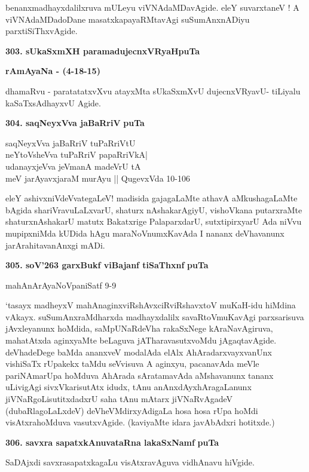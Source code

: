benanxmadhayxdalilxruva mULeyu viVNAdaMDavAgide. eleY suvarxtaneV ! A viVNAdaMDadoDane masatxkapayaRMtavAgi suSumAnxnADiyu parxtiSiThxvAgide.

\medskip
\noindent
\textbf{303. sUkaSxmXH paramadujecnxVRyaH\hfill {\bf puTa \pageref{40b}}}

\hfill {\bf rAmAyaNa - (4-18-15)}

\smallskip
dhamaRvu - paratatatxvXvu atayxMta sUkaSxmXvU dujecnxVRyavU- tiLiyalu kaSaTxsAdhayxvU Agide.

\medskip
\noindent
\textbf{304. saqNeyxVva jaBaRriV} \hfill {\bf puTa \pageref{page113}}

\begin{shloka}
saqNeyxVva jaBaRriV tuPaRriVtU\\
neYtoVsheVva tuPaRriV papaRriVkA|\\
udanayxjeVva jeVmanA madeVrU tA\\
meV jarAyavxjaraM murAyu || \hfill{QugevxVda 10-106}
\end{shloka}

eleY ashivxniVdeVvategaLeV! madisida gajagaLaMte athavA aMkushagaLaMte bAgida shariVravuLaLxvarU, shaturx nAshakarAgiyU, vishoVkana putarxraMte shaturxnAshakarU matutx Bakatxrige PalaparxdarU, sutxtipirxyarU  Ada niVvu mupipxniMda kUDida hAgu maraNoVnumxKavAda I nananx deVhavanunx jarArahitavanAnxgi mADi.

\medskip
\noindent
\textbf{305. soV\char'263 garxBukf viBajanf tiSaThxnf} \hfill {\bf puTa \pageref{239b}}

\hfill mahAnArAyaNoVpaniSatf 9-9

\smallskip
`tasayx madheyxV mahAnaginxviRshAvxciRviRshavxtoV muKaH-idu hiMdina vAkayx. suSumAnxraMdharxda madhayxdalilx savaRtoVmuKavAgi parxsarisuva jAvxleyanunx hoMdida, saMpUNaRdeVha rakaSxNege kAraNavAgiruva, mahatAtxda aginxyaMte beLaguva jATharavasutxvoMdu jAgaqtavAgide. deVhadeDege baMda ananxveV modalAda elAlx AhAradarxvayxvanUnx vishiSaTx rUpakekx taMdu seVvisuva A aginxyu, pacanavAda meVle pariNAmarUpa hoMduva AhArada sAratamavAda aMshavanunx tananx uLivigAgi sivxVkarisutAtx idudx, tAnu anAnxdAyxhAragaLanunx jiVNaRgoLisutitxdadxrU saha tAnu mAtarx jiVNaRvAgadeV (dubaRlagoLaLxdeV) deVheVMdirxyAdigaLa hosa hosa rUpa hoMdi visAtxrahoMduva vasutxvAgide. (kaviyaMte idara javAbAdxri hotitxde.)

\medskip
\noindent
\textbf{306. savxra sapatxkAnuvataRna lakaSxNamf} \hfill {\bf puTa \pageref{160}}

\smallskip
SaDAjxdi savxrasapatxkagaLu visAtxravAguva vidhAnavu hiVgide.

